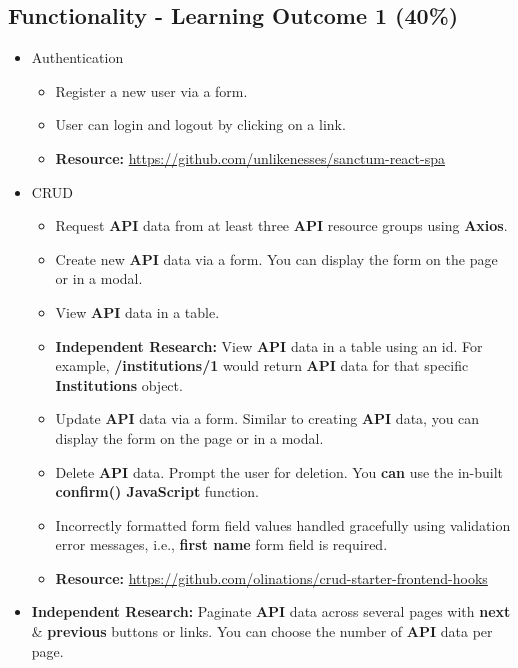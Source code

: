 \documentclass{article}
\begin{document}
\subsection*{Functionality - Learning Outcome 1 (40\%)}
\begin{itemize}
        \item Authentication
        \begin{itemize}
            \item Register a new user via a form.
            \item User can login and logout by clicking on a link. 
            \item \textbf{Resource:} \small\href{https://github.com/unlikenesses/sanctum-react-spa}{https://github.com/unlikenesses/sanctum-react-spa}
        \end{itemize}
        \item CRUD
        \begin{itemize}
            \item Request \textbf{API} data from at least three \textbf{API} resource groups using \textbf{Axios}.
            \item Create new \textbf{API} data via a form. You can display the form on the page or in a modal. 
            \item View \textbf{API} data in a table.
            \item \textbf{Independent Research:} View \textbf{API} data in a table using an id. For example, \textbf{/institutions/1} would return \textbf{API} data for that specific \textbf{Institutions} object.
            \item Update \textbf{API} data via a form. Similar to creating \textbf{API} data, you can display the form on the page or in a modal. 
            \item Delete \textbf{API} data. Prompt the user for deletion. You \textbf{can} use the in-built \textbf{confirm() JavaScript} function. 
            \item Incorrectly formatted form field values handled gracefully using validation error messages, i.e., \textbf{first name} form field is required.
            \item \textbf{Resource:} \small\href{https://github.com/olinations/crud-starter-frontend-hooks}{https://github.com/olinations/crud-starter-frontend-hooks}
        \end{itemize}
        \item \textbf{Independent Research:} Paginate \textbf{API} data across several pages with \textbf{next} \& \textbf{previous} buttons or links. You can choose the number of \textbf{API} data per page.

\end{itemize}
\end{document}
